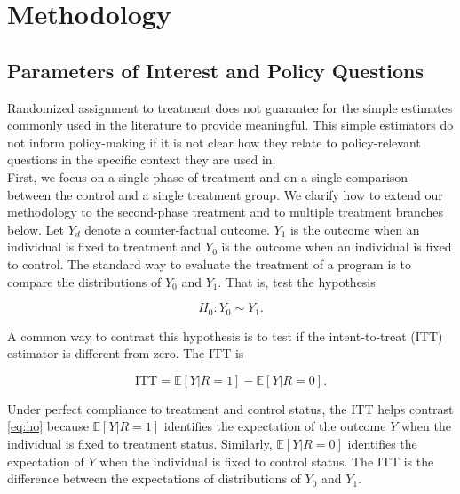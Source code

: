 

% 



\section{Methodology} \label{section:methodology}

\subsection{Parameters of Interest and Policy Questions} \label{section:methodsquestions}

\noindent Randomized assignment to treatment does not guarantee for the simple estimates commonly used in the literature to provide meaningful. This simple estimators do not inform policy-making if it is not clear how they relate to policy-relevant questions in the specific context they are used in.\\

\noindent First, we focus on a single phase of treatment and on a single comparison between the control and a single treatment group. We clarify how to extend our methodology to the second-phase treatment and to multiple treatment branches below. Let $Y_{d}$ denote a counter-factual outcome. $Y_{1}$ is the outcome when an individual is fixed to treatment and $Y_{0}$ is the outcome when an individual is fixed to control. The standard way to evaluate the treatment of a program is to compare the distributions of $Y_{0}$ and $Y_{1}$. That is, test the hypothesis 

\begin{equation}
H_{0}: Y_{0} \sim Y_{1}. \label{eq:ho}
\end{equation}

\noindent A common way to contrast this hypothesis is to test if the intent-to-treat (ITT) estimator is different from zero. The ITT is 

\begin{equation}
\text{ITT} = \mathbb{E} \left[ Y | R = 1 \right] - \mathbb{E} \left[ Y | R = 0 \right]. \label{eq:itt}
\end{equation} 

\noindent Under perfect compliance to treatment and control status, the ITT helps contrast \eqref{eq:ho} because $\mathbb{E} \left[ Y | R = 1 \right]$ identifies the expectation of the outcome $Y$ when the individual is fixed to treatment status. Similarly, $\mathbb{E} \left[ Y | R = 0 \right]$ identifies the expectation of $Y$ when the individual is fixed to control status. The ITT is the difference between the expectations of distributions of $Y_{0}$ and $Y_{1}$.

